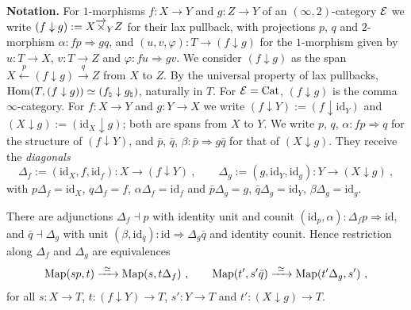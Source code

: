 %
\textbf{Notation.} For $1$-morphisms $f\colon X \to Y$ and $g\colon Z \to Y$ of
an $(\infty,2)$-category $\mathcal{E}$ we write
$(f \downarrow g) := X \overrightarrow{\times}_{Y} Z$
for their lax pullback, with projections $p$, $q$ and $2$-morphism
$\alpha\colon fp \Rightarrow gq$,
and
$(u,v,\varphi)\colon T \to (f \downarrow g)$
for the $1$-morphism given by $u\colon T \to X$, $v\colon T \to Z$ and
$\varphi\colon fu \Rightarrow gv$.
We consider $ (f\downarrow g) $ as the span
$ X \xleftarrow{p} (f\downarrow g) \xrightarrow{q} Z $
from $ X $ to $ Z $.
By the universal property of lax pullbacks,
$\operatorname{Hom}(T,(f \downarrow g)) \simeq (f_{\natural} \downarrow g_{\natural})$,
naturally in $T$.
For $\mathcal{E} = \mathrm{Cat}$, $(f \downarrow g)$ is the comma $\infty$-category.
For $f\colon X \to Y$ and $g\colon Y \to X$ we write
$(f \downarrow Y) := (f \downarrow \mathrm{id}_{Y})$
and
$(X \downarrow g) := (\mathrm{id}_{X} \downarrow g)$;
both are spans from $X$ to $Y$. We write $p$, $q$,
$\alpha\colon fp \Rightarrow q$
for the structure of $(f \downarrow Y)$, and $\bar p$, $\bar q$,
$\beta\colon \bar p \Rightarrow g\bar q$
for that of $(X \downarrow g)$. They receive the \emph{diagonals}
\begin{equation*}
\Delta_{f} := (\mathrm{id}_{X},f,\mathrm{id}_{f})\colon X \to (f \downarrow Y)
\ , \qquad \Delta_{g} := (g,\mathrm{id}_{Y},\mathrm{id}_{g})\colon Y \to (X
\downarrow g) \ ,
\end{equation*}
with
$p\Delta_{f} = \mathrm{id}_{X}$,
$q\Delta_{f} = f$,
$\alpha\Delta_{f} = \mathrm{id}_{f}$
and
$\bar p\Delta_{g} = g$,
$\bar q\Delta_{g} = \mathrm{id}_{Y}$,
$\beta\Delta_{g} = \mathrm{id}_{g}$.

\begin{lem}
\label{lem:comma-diagonal}
%
There are adjunctions
$\Delta_{f} \dashv p$
with identity unit and counit
$(\mathrm{id}_{p},\alpha)\colon \Delta_{f}p \Rightarrow \mathrm{id}$,
and
$\bar q \dashv \Delta_{g}$
with unit
$(\beta,\mathrm{id}_{\bar q})\colon \mathrm{id} \Rightarrow \Delta_{g}\bar q$
and identity counit. Hence restriction along $\Delta_{f}$ and $\Delta_{g}$ are
equivalences
\begin{equation*}
\mapp(sp,t) \xrightarrow{\ \simeq\ } \mapp(s,t\Delta_{f}) \ , \qquad
\mapp(t',s'\bar q) \xrightarrow{\ \simeq\ } \mapp(t'\Delta_{g},s') \ ,
\end{equation*}
for all
$s\colon X \to T$,
$t\colon (f \downarrow Y) \to T$,
$s'\colon Y \to T$
and
$t'\colon (X \downarrow g) \to T$.
\end{lem}

